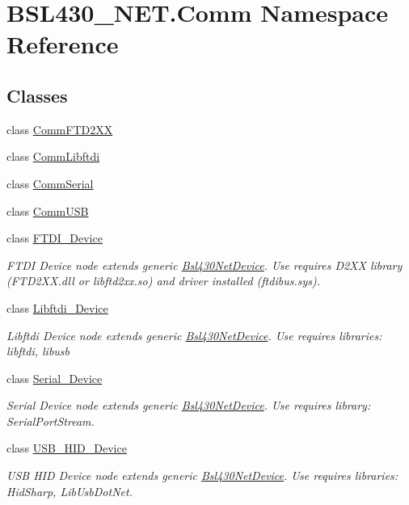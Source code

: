 \hypertarget{namespace_b_s_l430___n_e_t_1_1_comm}{}\section{B\+S\+L430\+\_\+\+N\+E\+T.\+Comm Namespace Reference}
\label{namespace_b_s_l430___n_e_t_1_1_comm}
\subsection*{Classes}
\begin{DoxyCompactItemize}
\item 
class \mbox{\hyperlink{class_b_s_l430___n_e_t_1_1_comm_1_1_comm_f_t_d2_x_x}{Comm\+F\+T\+D2\+XX}}
\item 
class \mbox{\hyperlink{class_b_s_l430___n_e_t_1_1_comm_1_1_comm_libftdi}{Comm\+Libftdi}}
\item 
class \mbox{\hyperlink{class_b_s_l430___n_e_t_1_1_comm_1_1_comm_serial}{Comm\+Serial}}
\item 
class \mbox{\hyperlink{class_b_s_l430___n_e_t_1_1_comm_1_1_comm_u_s_b}{Comm\+U\+SB}}
\item 
class \mbox{\hyperlink{class_b_s_l430___n_e_t_1_1_comm_1_1_f_t_d_i___device}{F\+T\+D\+I\+\_\+\+Device}}
\begin{DoxyCompactList}\small\item\em F\+T\+DI Device node extends generic \mbox{\hyperlink{class_b_s_l430___n_e_t_1_1_bsl430_net_device}{Bsl430\+Net\+Device}}. Use requires D2\+XX library (F\+T\+D2\+X\+X.\+dll or libftd2xx.\+so) and driver installed (ftdibus.\+sys). \end{DoxyCompactList}\item 
class \mbox{\hyperlink{class_b_s_l430___n_e_t_1_1_comm_1_1_libftdi___device}{Libftdi\+\_\+\+Device}}
\begin{DoxyCompactList}\small\item\em Libftdi Device node extends generic \mbox{\hyperlink{class_b_s_l430___n_e_t_1_1_bsl430_net_device}{Bsl430\+Net\+Device}}. Use requires libraries\+: libftdi, libusb \end{DoxyCompactList}\item 
class \mbox{\hyperlink{class_b_s_l430___n_e_t_1_1_comm_1_1_serial___device}{Serial\+\_\+\+Device}}
\begin{DoxyCompactList}\small\item\em Serial Device node extends generic \mbox{\hyperlink{class_b_s_l430___n_e_t_1_1_bsl430_net_device}{Bsl430\+Net\+Device}}. Use requires library\+: Serial\+Port\+Stream. \end{DoxyCompactList}\item 
class \mbox{\hyperlink{class_b_s_l430___n_e_t_1_1_comm_1_1_u_s_b___h_i_d___device}{U\+S\+B\+\_\+\+H\+I\+D\+\_\+\+Device}}
\begin{DoxyCompactList}\small\item\em U\+SB H\+ID Device node extends generic \mbox{\hyperlink{class_b_s_l430___n_e_t_1_1_bsl430_net_device}{Bsl430\+Net\+Device}}. Use requires libraries\+: Hid\+Sharp, Lib\+Usb\+Dot\+Net. \end{DoxyCompactList}\end{DoxyCompactItemize}
